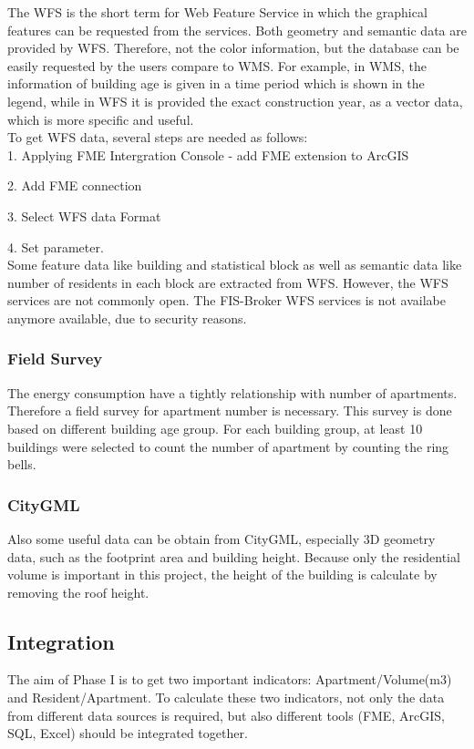 \documentclass[11pt]{article}
\begin{document}
The WFS  is the short term for Web Feature Service in which the graphical features can be requested from the services. Both geometry and semantic data are provided by WFS. Therefore, not the color information, but the database can be easily requested by the users compare to WMS. For example, in WMS, the information of building age is given in a time period which is shown in the legend, while in WFS it is provided the exact construction year, as a vector data, which is more specific and useful. \\
To get WFS data, several steps are needed  as follows:\\

1. Applying FME Intergration Console - add FME extension to ArcGIS

2. Add FME connection

3. Select WFS data Format

4. Set parameter.\\

Some feature data like building and statistical block as well as semantic data like number of residents in each block are extracted from WFS. However, the WFS services are not commonly open. The FIS-Broker WFS services is not availabe anymore available, due to security reasons.

\subsubsection{Field Survey}
The energy consumption have a tightly relationship with number of apartments. Therefore a field survey for apartment number is necessary. This survey is done based on different building age group. For each building group, at least 10 buildings were selected to count the number of apartment by counting the ring bells.
\subsubsection{CityGML}
Also some useful data can be obtain from CityGML, especially 3D geometry data, such as the footprint area and building height. Because only the residential volume is important in this project, the height of the building is calculate by removing the roof height.
\subsection{Integration}
The aim of Phase I is to get two important indicators: Apartment/Volume(m3) and Resident/Apartment. To calculate these two indicators, not only the data from different data sources is required, but also different tools (FME, ArcGIS, SQL, Excel) should be integrated together.
\end{document}

